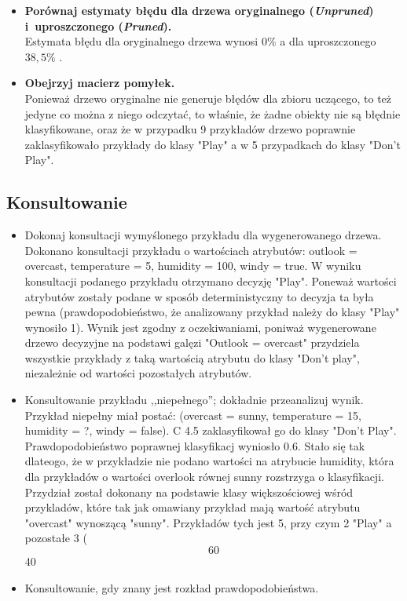 \begin{itemize}
\item \textbf{Porównaj estymaty błędu dla drzewa oryginalnego (\emph{Unpruned}) i~uproszczonego (\emph{Pruned}).}
	\\Estymata błędu dla oryginalnego drzewa wynosi  $ 0\% $ a dla uproszczonego $ 38,5\% $ .

\item \textbf{Obejrzyj macierz pomyłek.}
	\\Ponieważ drzewo oryginalne nie generuje błędów dla zbioru uczącego, to też jedyne co można z niego odczytać, to właśnie, że żadne obiekty nie są błędnie klasyfikowane, oraz że w przypadku 9 przykładów drzewo poprawnie zaklasyfikowało przykłady do klasy "Play" a w 5 przypadkach do klasy "Don't Play".

\end{itemize}

\subsection{Konsultowanie}

\begin{itemize}
\item Dokonaj konsultacji wymyślonego przykładu dla wygenerowanego drzewa.
	\\Dokonano konsultacji przykładu o wartościach atrybutów: outlook = overcast, temperature = 5, humidity = 100, windy = true. W wyniku konsultacji podanego przykładu otrzymano decyzję "Play". Poneważ wartości atrybutów zostały podane w sposób deterministyczny to decyzja ta była pewna (prawdopodobieństwo, że analizowany przykład należy do klasy "Play" wynosiło 1). Wynik jest zgodny z oczekiwaniami, poniważ wygenerowane drzewo decyzyjne na podstawi galęzi "Outlook = overcast" przydziela wszystkie przykłady z taką wartością atrybutu do klasy "Don't play", niezależnie od wartości pozostałych atrybutów.
	
\item Konsultowanie przykładu ,,niepełnego''; dokładnie przeanalizuj wynik.
	\\Przykład niepełny miał postać: (overcast = sunny, temperature = 15, humidity = ?, windy = false). C 4.5 zaklasyfikował go do klasy "Don't Play". Prawdopodobieństwo poprawnej klasyfikacj wyniosło 0.6. Stało się tak dlateogo, że w przykładzie nie podano wartości na atrybucie humidity, która dla przykładów o wartości overlook równej sunny rozstrzyga o klasyfikacji. Przydział został dokonany na podstawie klasy większościowej wśród przykladów, które tak jak omawiany przykład mają wartość atrybutu "overcast" wynoszącą "sunny". Przykładów tych jest 5, przy czym 2 "Play" a pozostałe 3 ($$ 60%
	$$ 40%
	
\item Konsultowanie, gdy znany jest rozkład prawdopodobieństwa.
\end{itemize}


